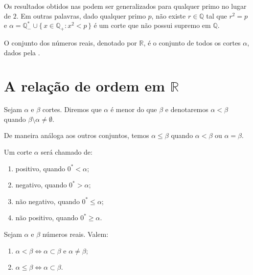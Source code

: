 \documentclass[../main.tex]{subfiles}
\begin{document}
\begin{obs}
    Os resultados obtidos nas  podem ser generalizados para qualquer primo no lugar de $2$. Em outras palavras, dado qualquer primo $p$, não existe $r \in \mathbb{Q}$ tal que $r^2 = p$ e 
    $\alpha = \mathbb{Q}_{-}^* \cup \{\,x \in \mathbb{Q}_{+} : x^2 < p\,\}$ é um corte que não possui supremo em $\mathbb{Q}$.
\end{obs}

\begin{defi}
    O conjunto dos números reais, denotado por $\mathbb{R}$, é o conjunto de todos os cortes $\alpha$, dados pela .
\end{defi}

\section{A relação de ordem em $\mathbb{R}$}

\begin{defi}\label{reais-def-relacaoOrdem}
    Sejam $\alpha$ e $\beta$ cortes. Diremos que $\alpha$ é menor do que $\beta$ e denotaremos $\alpha < \beta$ quando $\beta \setminus \alpha \neq \emptyset$.
\end{defi}
\begin{obs}
    De maneira análoga aos outros conjuntos, temos $\alpha \leq \beta$ quando $\alpha < \beta$ ou $\alpha = \beta$.
\end{obs}
\begin{defi}
    Um corte $\alpha$ será chamado de:
    \begin{enumerate}[label=(\roman*)]
        \item positivo, quando $0^* < \alpha$;
        \item negativo, quando $0^* > \alpha$;
        \item não negativo, quando $0^* \leq \alpha$;
        \item não positivo, quando $0^* \geq \alpha$.
    \end{enumerate}
\end{defi}

\begin{teo}\label{reais-teo-subset}
    Sejam $\alpha$ e $\beta$ números reais. Valem:
    \begin{enumerate}[label=(\roman*)]
        \item $\alpha < \beta \iff \alpha \subset \beta$ e $\alpha \neq \beta$;
        \item $\alpha \leq \beta \iff \alpha \subset \beta$.
    \end{enumerate}
\end{teo}
\end{document}
